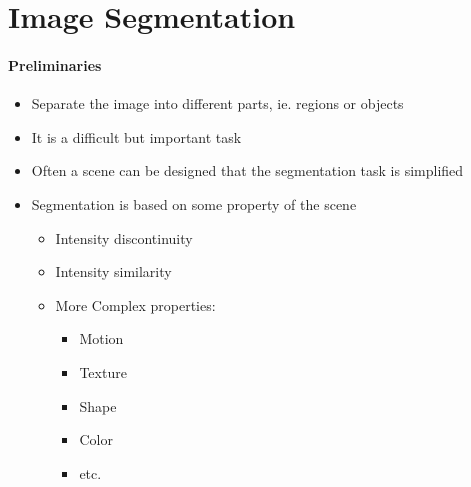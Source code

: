 \section{Image Segmentation}
\paragraph{Preliminaries}
\begin{itemize}
\item Separate the image into different parts, ie. regions or objects
\item It is a difficult but important task
\item Often a scene can be designed that the segmentation task is simplified
\item Segmentation is based on some property of the scene
\begin{itemize}
\item Intensity discontinuity
\item Intensity similarity
\item More Complex properties:
\begin{itemize}
\item Motion
\item Texture
\item Shape
\item Color
\item etc.
\end{itemize}
\end{itemize}
\end{itemize}

